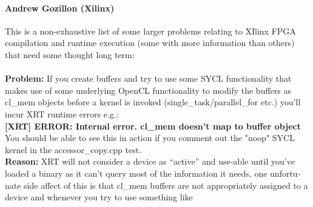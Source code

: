 \begin{otherlanguage}{english}
    \paragraph{Andrew Gozillon (Xilinx)} This is a non-exhaustive list of some
                                         larger problems relating to XIlinx FPGA
                                         compilation and runtime execution (some
                                         with more information than others) that
                                         need some thought long term:\\
                                         \\
                                         \textbf{Problem:} If you create buffers
                                         and try to use some SYCL functionality
                                         that makes use of some underlying
                                         OpenCL functionality to modify the
                                         buffers as cl\_mem objects before a
                                         kernel is invoked
                                         (single\_task/parallel\_for etc.)
                                         you'll incur XRT runtime errors e.g.:
                                         \\
                                         \textbf{[XRT] ERROR: Internal error.
                                         cl\_mem doesn't map to buffer object}
                                         \\
                                         You should be able to see this in
                                         action if you comment out the "noop"
                                         SYCL kernel in the accessor\_copy.cpp
                                         test.
                                         \\
                                         \textbf{Reason:} XRT will not consider
                                         a device as ``active'' and use-able
                                         until you've loaded a binary as it
                                         can't query most of the information it
                                         needs, one unfortunate side affect of
                                         this is that cl\_mem buffers are not
                                         appropriately assigned to a device and
                                         whenever you try to use something like

\end{otherlanguage}
